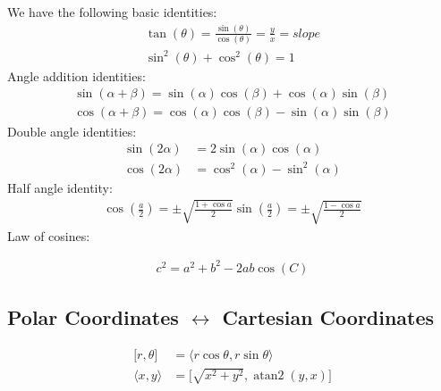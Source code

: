 \documentclass[12pt]{report}
\DeclareMathOperator{\atan}{atan2}
\begin{document}
We have the following basic identities:
\begin{align*}
\tan(\theta) = \frac{\sin(\theta)}{\cos(\theta)} = \frac{y}{x} = slope \\
\sin^2(\theta) + \cos^2(\theta) = 1
\end{align*}
Angle addition identities:
\begin{align*}
\sin(\alpha + \beta) = \sin(\alpha)\cos (\beta) + \cos(\alpha)\sin(\beta) \\
\cos(\alpha + \beta) = \cos(\alpha)\cos (\beta) - \sin(\alpha)\sin(\beta)
\end{align*}
Double angle identities:
\begin{align*}
\sin(2\alpha) &= 2\sin(\alpha)\cos (\alpha) \\
\cos(2\alpha) &= \cos^2(\alpha)- \sin^2(\alpha)
\end{align*}
Half angle identity:
\begin{align*}
\cos\left(\frac{a}{2}\right) = \pm \sqrt{\frac{1 + \cos{a}}{2}}
\sin\left(\frac{a}{2}\right) = \pm \sqrt{\frac{1 - \cos{a}}{2}}
\end{align*}
Law of cosines:

\begin{align*}
c^2 = a^2 + b^2 -2ab\cos(C)
\end{align*}
\subsection{Polar Coordinates $\leftrightarrow$ Cartesian Coordinates}
\begin{align*}
\lbrack r, \theta \rbrack &= \langle r\cos\theta, r\sin\theta \rangle \\
\langle x, y \rangle &= \lbrack \sqrt{x^2 + y^2}, \atan(y, x) \rbrack
\end{align*}
\end{document}

